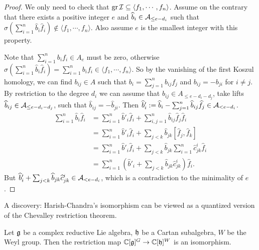 \begin{proof}
  We only need to check that $\operatorname{gr} \mathcal{I} \subseteq \langle f_1, \cdots, f_n\rangle$. Assume on the contrary that there exists a positive integer $e$ and $\widehat{b}_i \in \mathcal{A}_{\leq e-d_i}$ such that $\sigma(\sum_{i=1}^{n} \widehat{b}_i \widehat{f}_i) \notin \langle f_1, \cdots, f_n\rangle$. Also assume $e$ is the smallest integer with this property.

  Note that $\sum_{i=1}^{n} b_i f_i \in A_{e}$ must be zero, otherwise $\sigma(\sum_{i=1}^{n} \widehat{b}_i \widehat{f}_i) = \sum_{i=1}^{n} b_i f_i \in \langle f_1, \cdots, f_n\rangle$. So by the vanishing of the first Koszul homology, we can find $b_{ij} \in A$ such that $b_i = \sum_{j=1}^{n} b_{ij} f_j$ and $b_{ij} = -b_{ji}$ for $i \neq j$. By restriction to the degree $d_i$ we can assume that $b_{ij} \in A_{\leq e-d_i - d_j}$, take lifts $\widehat{b}_{ij} \in \mathcal{A}_{\leq e-d_i - d_j}$, such that $\widehat{b}_{ij} = -\widehat{b}_{ji}$. Then $\widehat{b}'_i := \widehat{b}_i - \sum_{j=1}^{n} \widehat{b}_{ij} \widehat{f}_j \in \mathcal{A}_{< e - d_i}$.
  \begin{align*}
    \sum_{i=1}^{n} \widehat{b}_i \widehat{f}_i &= \sum_{i=1}^{n} \widehat{b}'_i \widehat{f}_i + \sum_{i,j=1}^{n} \widehat{b}_{ij} \widehat{f}_j \widehat{f}_i \\
    &= \sum_{i=1}^{n} \widehat{b}'_i \widehat{f}_i +  \sum_{j < k} \widehat{b}_{jk} [\widehat{f}_j, \widehat{f}_k] \\
    &= \sum_{i=1}^{n} \widehat{b}'_i \widehat{f}_i +  \sum_{j < k} \widehat{b}_{jk} \sum_{i = 1}^{n} \widehat{c}_{jk}^i \widehat{f}_i \\
    &= \sum_{i=1}^{n} \left( \widehat{b}'_i + \sum_{j < k} \widehat{b}_{jk} \widehat{c}_{jk}^i \right) \widehat{f}_i.
  \end{align*}
  But $\widehat{b}'_i + \sum_{j < k} \widehat{b}_{jk} \widehat{c}_{jk}^i \in \mathcal{A}_{< e - d_i}$, which is a contradiction to the minimality of $e$.
\end{proof}


A discovery: Harish-Chandra's isomorphism can be viewed as a quantized version of the Chevalley restriction theorem.

\begin{thm}
  Let $\mathfrak{g}$ be a complex reductive Lie algebra, $\mathfrak{h}$ be a Cartan subalgebra, $W$ be the Weyl group. Then the restriction map $\mathbb{C}[\mathfrak{g}]^G \to \mathbb{C}[\mathfrak{h}]^W$ is an isomorphism.
\end{thm}

